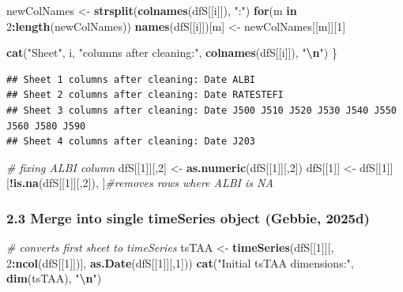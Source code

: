 \documentclass[
  12pt,
]{article}
\newenvironment{Shaded}{\begin{snugshade}}{\end{snugshade}}
\newcommand{\CommentTok}[1]{\textcolor[rgb]{0.56,0.35,0.01}{\textit{#1}}}
\newcommand{\ControlFlowTok}[1]{\textcolor[rgb]{0.13,0.29,0.53}{\textbf{#1}}}
\newcommand{\DecValTok}[1]{\textcolor[rgb]{0.00,0.00,0.81}{#1}}
\newcommand{\FunctionTok}[1]{\textcolor[rgb]{0.13,0.29,0.53}{\textbf{#1}}}
\newcommand{\NormalTok}[1]{#1}
\newcommand{\OtherTok}[1]{\textcolor[rgb]{0.56,0.35,0.01}{#1}}
\newcommand{\SpecialCharTok}[1]{\textcolor[rgb]{0.81,0.36,0.00}{\textbf{#1}}}
\newcommand{\StringTok}[1]{\textcolor[rgb]{0.31,0.60,0.02}{#1}}
\begin{document}
\begin{Shaded}
\begin{Highlighting}[]
\NormalTok{  newColNames }\OtherTok{\textless{}{-}} \FunctionTok{strsplit}\NormalTok{(}\FunctionTok{colnames}\NormalTok{(dfS[[i]]), }\StringTok{":"}\NormalTok{)}
  \ControlFlowTok{for}\NormalTok{(m }\ControlFlowTok{in} \DecValTok{2}\SpecialCharTok{:}\FunctionTok{length}\NormalTok{(newColNames)) }\FunctionTok{names}\NormalTok{(dfS[[i]])[m] }\OtherTok{\textless{}{-}}\NormalTok{ newColNames[[m]][}\DecValTok{1}\NormalTok{]}
  
  \FunctionTok{cat}\NormalTok{(}\StringTok{"Sheet"}\NormalTok{, i, }\StringTok{"columns after cleaning:"}\NormalTok{, }\FunctionTok{colnames}\NormalTok{(dfS[[i]]), }\StringTok{"}\SpecialCharTok{\textbackslash{}n}\StringTok{"}\NormalTok{)}
\NormalTok{\}}
\end{Highlighting}
\end{Shaded}

\begin{verbatim}
## Sheet 1 columns after cleaning: Date ALBI 
## Sheet 2 columns after cleaning: Date RATESTEFI 
## Sheet 3 columns after cleaning: Date J500 J510 J520 J530 J540 J550 J560 J580 J590 
## Sheet 4 columns after cleaning: Date J203
\end{verbatim}

\begin{Shaded}
\begin{Highlighting}[]
\CommentTok{\# fixing ALBI column}
\NormalTok{dfS[[}\DecValTok{1}\NormalTok{]][,}\DecValTok{2}\NormalTok{] }\OtherTok{\textless{}{-}} \FunctionTok{as.numeric}\NormalTok{(dfS[[}\DecValTok{1}\NormalTok{]][,}\DecValTok{2}\NormalTok{])  }
\NormalTok{dfS[[}\DecValTok{1}\NormalTok{]] }\OtherTok{\textless{}{-}}\NormalTok{ dfS[[}\DecValTok{1}\NormalTok{]][}\SpecialCharTok{!}\FunctionTok{is.na}\NormalTok{(dfS[[}\DecValTok{1}\NormalTok{]][,}\DecValTok{2}\NormalTok{]), ]}\CommentTok{\#removes rows where ALBI is NA}
\end{Highlighting}
\end{Shaded}

\subsubsection{2.3 Merge into single timeSeries object (Gebbie,
2025d)}\label{merge-into-single-timeseries-object-tim_prep}

\begin{Shaded}
\begin{Highlighting}[]
\CommentTok{\# converts first sheet to timeSeries}
\NormalTok{tsTAA }\OtherTok{\textless{}{-}} \FunctionTok{timeSeries}\NormalTok{(dfS[[}\DecValTok{1}\NormalTok{]][, }\DecValTok{2}\SpecialCharTok{:}\FunctionTok{ncol}\NormalTok{(dfS[[}\DecValTok{1}\NormalTok{]])], }\FunctionTok{as.Date}\NormalTok{(dfS[[}\DecValTok{1}\NormalTok{]][,}\DecValTok{1}\NormalTok{]))}
\FunctionTok{cat}\NormalTok{(}\StringTok{"Initial tsTAA dimensions:"}\NormalTok{, }\FunctionTok{dim}\NormalTok{(tsTAA), }\StringTok{"}\SpecialCharTok{\textbackslash{}n}\StringTok{"}\NormalTok{)}
\end{Highlighting}
\end{Shaded}
\end{document}
